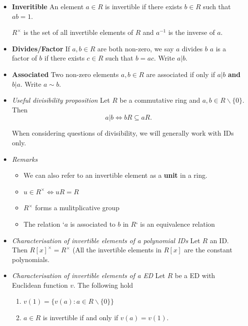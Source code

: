 \documentclass[a4paper, 12pt]
{article}
\newcommand{\inv}[1]{#1^\times}
\newcommand{\rpol}{R[x]}
\newcommand{\nonzeroset}[1]{#1 \backslash \{0\}}
\newcommand{\letter}[1]{$#1$}
\begin{document}
\begin{itemize}
		
		In the next three definitions, let $R$ be a commutative unital ring, with multiplicative identity 1 and additive identity 0.
		
		\item \textbf{Inveritible} An element $a\in R$ is invertible if there exists $b\in R$ such that $ab=1.$
		
		 $\inv{R}$ is the set of all invertible elements of $R$ and $a^{-1}$ is the inverse of $a.$
		
		\item \textbf{Divides/Factor} If $a,b \in R$ are both non-zero, we say $a$ divides $b$  $a$ is a factor of  $b$ if there exists $c\in R$ such that $b=ac.$ Write $a|b.$
		
		\item  \textbf{Associated} Two non-zero elements $a,b\in R$ are associated if only if $a | b$ \textbf{and} $b|a.$ Write $a \sim b.$
		
		\item \textit{Useful divisibility proposition}
		Let $R$ be a commutative ring and $a,b\in R\backslash \{0\}.$ Then $$a|b \iff bR \subseteq aR.$$
		
		When considering questions of divisibility, we will generally work with IDs only.
		
		\item \textit{Remarks}
		\begin{itemize}
			\item We can also refer to an invertible element as a \textbf{unit} in a ring.
			\item $u \in\inv{R} \iff uR=R$
			\item $\inv{R}$ forms a mulitplicative group
			\item The relation `$a$ is associated to $b$ in $R$` is an equivalence relation
		\end{itemize}
		
		\item \textit{Characterisation of invertible elements of a polynomial IDs} Let \letter{R} an ID. Then $\inv{\rpol}=\inv{R}$ (All	 the invertible elements in $\rpol$ are the constant polynomials.
		
		\item \textit{Characterisation of invertible elements of a ED}
		Let $R$ be a ED with Euclidean function $v.$ The following hold
		\begin{enumerate}[label=(\roman*)]
			\item $v(1) =\{v(a): a \in \nonzeroset{R}\}$
			\item $a\in R$ is invertible if and only if $v(a)=v(1).$
		\end{enumerate}
		

\end{itemize}
\end{document}
